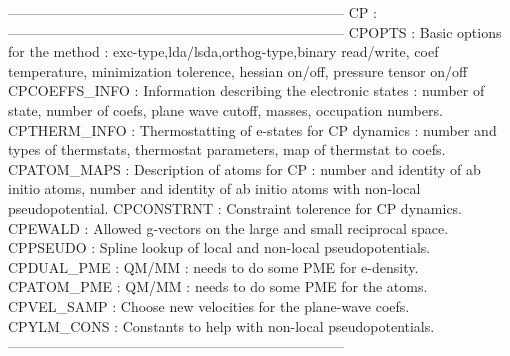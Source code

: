                                                        ------------------------------------------------------------------------
                                                       CP :
                                                       ------------------------------------------------------------------------
                                                       CPOPTS        : Basic options for the method :
                                                       exc-type,lda/lsda,orthog-type,binary read/write,
                                                       coef temperature, minimization tolerence, hessian on/off,
                                                       pressure tensor on/off
                                                       CPCOEFFS_INFO : Information describing the electronic states :
                                                       number of state, number of coefs, plane wave cutoff,
                                                       masses, occupation numbers.
                                                       CPTHERM_INFO  : Thermostatting of e-states for CP dynamics :
                                                       number and types of thermstats, thermostat parameters,
                                                       map of thermstat to coefs.
                                                       CPATOM_MAPS   : Description of atoms for CP :
                                                       number and identity of ab initio atoms,
                                                       number and identity of ab initio atoms with non-local
                                                       pseudopotential.
                                                       CPCONSTRNT    : Constraint tolerence for CP dynamics.
                                                       CPEWALD       : Allowed g-vectors on the large and small reciprocal space.
                                                       CPPSEUDO      : Spline lookup of local and non-local pseudopotentials.
                                                       CPDUAL_PME    : QM/MM : needs to do some PME for e-density.
                                                       CPATOM_PME    : QM/MM : needs to do some PME for the atoms.
                                                       CPVEL_SAMP    : Choose new velocities for the plane-wave coefs.
                                                       CPYLM_CONS    : Constants to help with non-local pseudopotentials.
                                                       ------------------------------------------------------------------------
